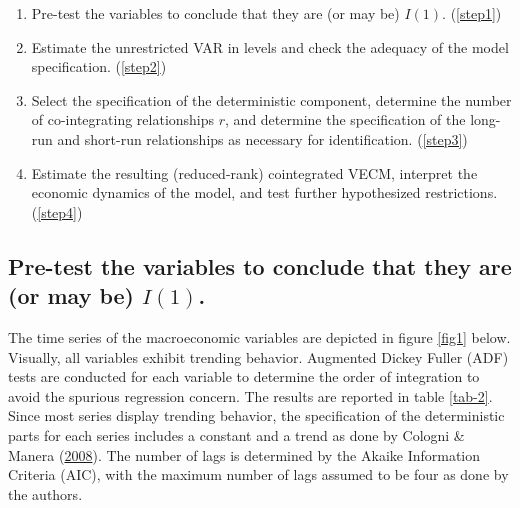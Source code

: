 \documentclass[11pt,preprint, authoryear]{elsarticle}
\numberwithin{equation}{section}
\numberwithin{figure}{section}
\numberwithin{table}{section}
\begin{document}
\begin{enumerate}
\item Pre-test the variables to conclude that they are (or may be) $I(1)$. (\ref{step1})
\item Estimate the unrestricted VAR in levels and check the adequacy of the model specification. (\ref{step2})
\item Select the specification of the deterministic component, determine the number of co-integrating relationships $r$, and determine the specification of the long-run and short-run relationships as necessary for identification. (\ref{step3})
\item Estimate the resulting (reduced-rank) cointegrated VECM, interpret the economic dynamics of the model, and test further hypothesized restrictions. (\ref{step4})
\end{enumerate}

\hypertarget{pre-test-the-variables-to-conclude-that-they-are-or-may-be-i1.}{%
\subsection{\texorpdfstring{Pre-test the variables to conclude that they
are (or may be) \(I(1)\).
\label{step1}}{Pre-test the variables to conclude that they are (or may be) I(1). }}\label{pre-test-the-variables-to-conclude-that-they-are-or-may-be-i1.}}

The time series of the macroeconomic variables are depicted in figure
\ref{fig1} below. Visually, all variables exhibit trending behavior.
Augmented Dickey Fuller (ADF) tests are conducted for each variable to
determine the order of integration to avoid the spurious regression
concern. The results are reported in table \ref{tab-2}. Since most
series display trending behavior, the specification of the deterministic
parts for each series includes a constant and a trend as done by Cologni
\& Manera (\protect\hyperlink{ref-cologni2008}{2008}). The number of
lags is determined by the Akaike Information Criteria (AIC), with the
maximum number of lags assumed to be four as done by the authors.
\end{document}
